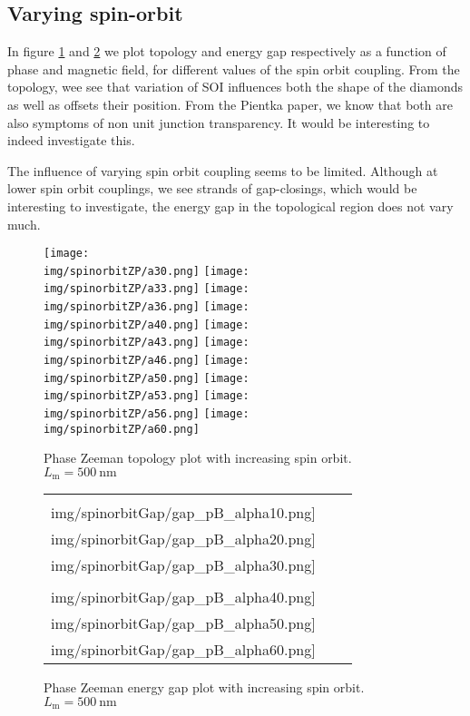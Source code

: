 \documentclass[10pt,a4paper]{article}
\newcommand{\img}{./images}
\begin{document}
\newpage
	\subsection{Varying spin-orbit}
	In figure \ref{fig:pfaf_pB_soi} and \ref{fig:gap_pB_soi} we plot topology and energy gap respectively as a function of phase and magnetic field, for different values of the spin orbit coupling.
	From the topology, wee see that variation of SOI influences both the shape of the diamonds as well as offsets their position.
	From the Pientka paper, we know that both are also symptoms of non unit junction transparency.
	It would be interesting to indeed investigate this.
	
	The influence of varying spin orbit coupling seems to be limited.
	Although at lower spin orbit couplings, we see strands of gap-closings, which would be interesting to investigate, the energy gap in the topological region does not vary much.
		\begin{figure}[H]
			\texttt{[image: \\img/spinorbitZP/a30.png]}
			\texttt{[image: \\img/spinorbitZP/a33.png]}
			\texttt{[image: \\img/spinorbitZP/a36.png]}
			\texttt{[image: \\img/spinorbitZP/a40.png]}
			\texttt{[image: \\img/spinorbitZP/a43.png]}
			\texttt{[image: \\img/spinorbitZP/a46.png]}
			\texttt{[image: \\img/spinorbitZP/a50.png]}
			\texttt{[image: \\img/spinorbitZP/a53.png]}
			\texttt{[image: \\img/spinorbitZP/a56.png]}
			\texttt{[image: \\img/spinorbitZP/a60.png]}
			\caption{Phase Zeeman topology plot with increasing spin orbit. $L_\text{m}=\SI{500}{\nm}$}
			\label{fig:pfaf_pB_soi}
		\end{figure}
	
		\begin{figure}[H]
			\begin{tabular}{ccc}
				\texttt{[image: \\img/spinorbitGap/gap\_pB\_alpha10.png]}&
				\texttt{[image: \\img/spinorbitGap/gap\_pB\_alpha20.png]}&
				\texttt{[image: \\img/spinorbitGap/gap\_pB\_alpha30.png]}\\
				\texttt{[image: \\img/spinorbitGap/gap\_pB\_alpha40.png]}&
				\texttt{[image: \\img/spinorbitGap/gap\_pB\_alpha50.png]}&
				\texttt{[image: \\img/spinorbitGap/gap\_pB\_alpha60.png]}\\
			\end{tabular}
			\caption{Phase Zeeman energy gap plot with increasing spin orbit. $L_\text{m}=\SI{500}{\nm}$}
			\label{fig:gap_pB_soi}
		\end{figure}
\newpage	
\end{document}
